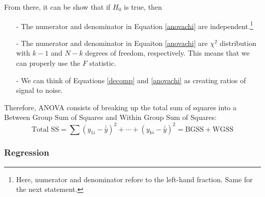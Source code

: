 \documentclass[a4paper,12pt]{scrartcl}
\begin{document}
From there, it can be show that if $H_0$ is true, then
\begin{itemize}
   \item[-] The numerator and denominator in
      Equation \ref{anovachi} are independent.\footnote{Here,
      numerator and denominator refore to the left-hand fraction.
      Same for the next statement.}
   \item[-] The numerator and denominator in Equaiton
      \ref{anovachi} are $\chi^2$ distribution
      with $k-1$ and $N-k$ degrees of freedom, respectively. This
      means that we can properly use the $F$ statistic.
   \item[-] We can think of Equations \ref{decomp} and \ref{anovachi}
      as creating ratios of signal to noise.
\end{itemize}
Therefore, ANOVA consists of breaking up the total sum of squares
into a Between Group Sum of Squares and Within Group Sum of Squares:
\[ \text{Total SS} = \sum (y_{1i}-\bar{\bar{y}})^2 + \cdots +
   (y_{ki}-\bar{\bar{y}})^2
   = \text{BGSS} + \text{WGSS} \]


\newpage
\subsubsection{Regression}
\end{document}
